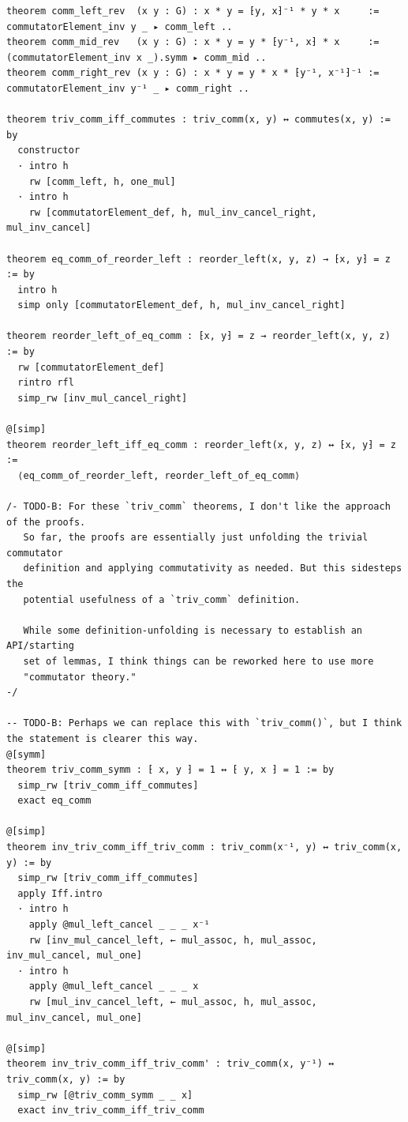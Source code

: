 \documentclass[10pt,a4paper]{article}
\begin{document}
\begin{Verbatim}
theorem comm_left_rev  (x y : G) : x * y = ⁅y, x⁆⁻¹ * y * x     := commutatorElement_inv y _ ▸ comm_left ..
theorem comm_mid_rev   (x y : G) : x * y = y * ⁅y⁻¹, x⁆ * x     := (commutatorElement_inv x _).symm ▸ comm_mid ..
theorem comm_right_rev (x y : G) : x * y = y * x * ⁅y⁻¹, x⁻¹⁆⁻¹ := commutatorElement_inv y⁻¹ _ ▸ comm_right ..

theorem triv_comm_iff_commutes : triv_comm(x, y) ↔ commutes(x, y) := by
  constructor
  · intro h
    rw [comm_left, h, one_mul]
  · intro h
    rw [commutatorElement_def, h, mul_inv_cancel_right, mul_inv_cancel]

theorem eq_comm_of_reorder_left : reorder_left(x, y, z) → ⁅x, y⁆ = z := by
  intro h
  simp only [commutatorElement_def, h, mul_inv_cancel_right]

theorem reorder_left_of_eq_comm : ⁅x, y⁆ = z → reorder_left(x, y, z) := by
  rw [commutatorElement_def]
  rintro rfl
  simp_rw [inv_mul_cancel_right]

@[simp]
theorem reorder_left_iff_eq_comm : reorder_left(x, y, z) ↔ ⁅x, y⁆ = z :=
  ⟨eq_comm_of_reorder_left, reorder_left_of_eq_comm⟩

/- TODO-B: For these `triv_comm` theorems, I don't like the approach of the proofs.
   So far, the proofs are essentially just unfolding the trivial commutator
   definition and applying commutativity as needed. But this sidesteps the
   potential usefulness of a `triv_comm` definition.

   While some definition-unfolding is necessary to establish an API/starting
   set of lemmas, I think things can be reworked here to use more
   "commutator theory."
-/

-- TODO-B: Perhaps we can replace this with `triv_comm()`, but I think the statement is clearer this way.
@[symm]
theorem triv_comm_symm : ⁅ x, y ⁆ = 1 ↔ ⁅ y, x ⁆ = 1 := by
  simp_rw [triv_comm_iff_commutes]
  exact eq_comm

@[simp]
theorem inv_triv_comm_iff_triv_comm : triv_comm(x⁻¹, y) ↔ triv_comm(x, y) := by
  simp_rw [triv_comm_iff_commutes]
  apply Iff.intro
  · intro h
    apply @mul_left_cancel _ _ _ x⁻¹
    rw [inv_mul_cancel_left, ← mul_assoc, h, mul_assoc, inv_mul_cancel, mul_one]
  · intro h
    apply @mul_left_cancel _ _ _ x
    rw [mul_inv_cancel_left, ← mul_assoc, h, mul_assoc, mul_inv_cancel, mul_one]

@[simp]
theorem inv_triv_comm_iff_triv_comm' : triv_comm(x, y⁻¹) ↔ triv_comm(x, y) := by
  simp_rw [@triv_comm_symm _ _ x]
  exact inv_triv_comm_iff_triv_comm


\end{Verbatim}
\end{document}
